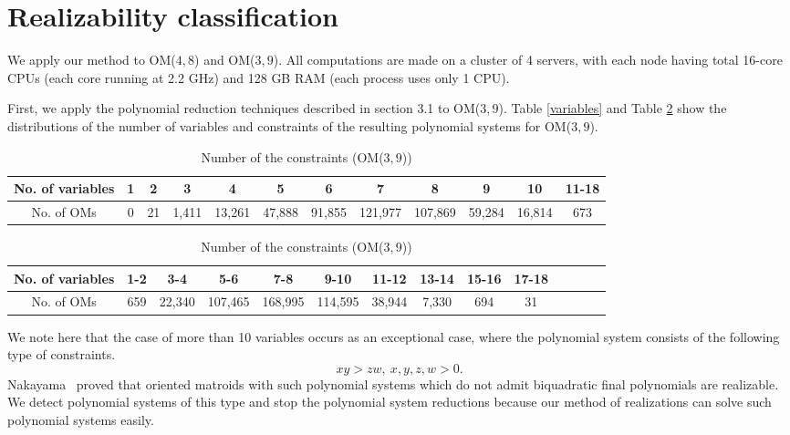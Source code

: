 \documentclass{article}
\begin{document}
\section{Realizability classification} \label{RealClass}
We apply our method to OM($4,8$) and OM($3,9$). All computations are made on a cluster of 4 servers, with each node having
total 16-core CPUs (each core running at 2.2 GHz) and 128 GB RAM (each process uses only 1 CPU).

First, we apply the polynomial reduction techniques described in section 3.1 to  OM($3,9$).
Table \ref{variables} and Table \ref{constraints} show the distributions of the number of variables and constraints of the resulting polynomial systems
for OM($3,9$).

\begin{table}[h]
\begin{center}
\begin{tabular}{| c | c | c | c | c | c | c | c | c | c | c | c |  }
\hline
No. of variables & 1& 2 & 3 & 4 &  5 & 6 & 7 & 8 & 9 & 10 & 11-18 \\
 \hline
No. of OMs & 0 &  21 & 1,411 & 13,261 & 47,888 & 91,855 & 121,977 & 107,869 & 59,284 & 16,814 & 673\\
 \hline 
\end{tabular}
\end{center}
\caption{Number of the variables (OM($3,9$))}
\label{variables}



\begin{center}
\begin{tabular}{| c | c | c | c | c | c | c | c | c | c | c | c | c | c |  }
\hline
No. of variables & 1-2 & 3-4 & 5-6 & 7-8 &  9-10 & 11-12 & 13-14 & 15-16 & 17-18 \\
 \hline
No. of OMs & 659 & 22,340 & 107,465 & 168,995 & 114,595 &  38,944 & 7,330 & 694 & 31\\
 \hline 
\end{tabular}
\end{center}
\caption{Number of the constraints (OM($3,9$))}
\label{constraints}
\end{table} 
We note here that the case of more than 10 variables occurs as an exceptional case, where
the polynomial system consists of the following type of constraints.
\[ xy > zw, \ x,y,z,w > 0.\]
Nakayama~\cite{N07} proved that oriented matroids with such polynomial systems which
do not admit  biquadratic final polynomials are realizable. 
We detect polynomial systems of this type and stop the polynomial system reductions
because our method of realizations can solve such polynomial systems easily.
\end{document}
